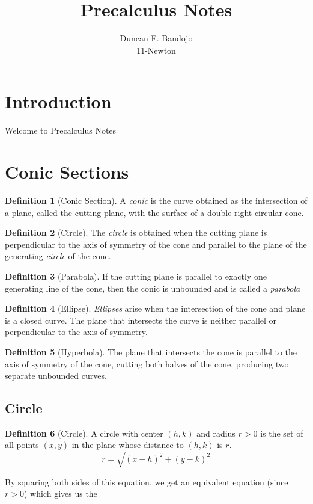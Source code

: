 \documentclass[a4paper]{article}
\title{Precalculus Notes}
\author{Duncan F. Bandojo \\ 11-Newton}
\theoremstyle{definition}
\newtheorem*{defi}{Definition}
\begin{document}
\maketitle

\tableofcontents
\setcounter{section}{-1}
\section{Introduction}
Welcome to Precalculus Notes

\section{Conic Sections }
\begin{defi}[Conic Section]
    A \emph{conic} is the curve obtained as the intersection of a plane, called
    the cutting plane, with the surface of a double right circular cone.
\end{defi}
\begin{defi}[Circle]
    The \emph{circle} is obtained when the cutting plane is perpendicular to the
    axis of symmetry of the cone and parallel to the plane of the generating
    \emph{circle} of the cone.
\end{defi}
\begin{defi}[Parabola]
    If the cutting plane is parallel to exactly one generating line of the cone,
    then the conic is unbounded and is called a \emph{parabola}
\end{defi}
\begin{defi}[Ellipse]
    \emph{Ellipses} arise when the intersection of the cone and plane is a
    closed curve. The plane that intersects the curve is neither parallel or
    perpendicular to the axis of symmetry.
\end{defi}
\begin{defi}[Hyperbola]
     The plane that intersects the cone is parallel to the axis of symmetry of
     the cone, cutting both halves of the cone, producing two separate unbounded
     curves.
\end{defi}

\subsection{Circle}
\begin{defi}[Circle]
    A circle with center $(h, k)$ and radius $r > 0$ is the set of all points
     $(x,y)$ in the plane whose distance to $(h,k)$ is $r$.
     \begin{equation*}
          r=\sqrt{(x-h)^2+(y-k)^2}
     \end{equation*}
\end{defi}
By squaring both sides of this equation, we get an equivalent equation (since $r
> 0$) which gives us the
\end{document}
